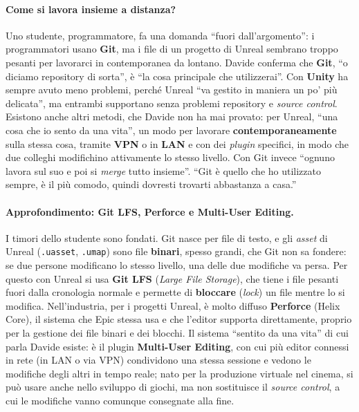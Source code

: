 \paragraph{Come si lavora insieme a distanza?} Uno studente, programmatore, fa una
domanda ``fuori dall'argomento'': i programmatori usano \textbf{Git}, ma i file di un
progetto di Unreal sembrano troppo pesanti per lavorarci in contemporanea da lontano.
Davide conferma che \textbf{Git}, ``o diciamo repository di sorta'', è ``la cosa
principale che utilizzerai''. Con \textbf{Unity} ha sempre avuto meno problemi, perché
Unreal ``va gestito in maniera un po' più delicata'', ma entrambi supportano senza
problemi repository e \emph{source control}. Esistono anche altri metodi, che Davide non
ha mai provato: per Unreal, ``una cosa che io sento da una vita'', un modo per lavorare
\textbf{contemporaneamente} sulla stessa cosa, tramite \textbf{VPN} o in \textbf{LAN} e
con dei \emph{plugin} specifici, in modo che due colleghi modifichino attivamente lo
stesso livello. Con Git invece ``ognuno lavora sul suo e poi si \emph{merge} tutto
insieme''. ``Git è quello che ho utilizzato sempre, è il più comodo, quindi dovresti
trovarti abbastanza a casa.''

\paragraph{Approfondimento: Git LFS, Perforce e Multi-User Editing.} I timori dello
studente sono fondati. Git nasce per file di testo, e gli \emph{asset} di Unreal
(\texttt{.uasset}, \texttt{.umap}) sono file \textbf{binari}, spesso grandi, che Git non
sa fondere: se due persone modificano lo stesso livello, una delle due modifiche va
persa. Per questo con Unreal si usa \textbf{Git LFS} (\emph{Large File Storage}), che
tiene i file pesanti fuori dalla cronologia normale e permette di \textbf{bloccare}
(\emph{lock}) un file mentre lo si modifica. Nell'industria, per i progetti Unreal, è
molto diffuso \textbf{Perforce} (Helix Core), il sistema che Epic stessa usa e che
l'editor supporta direttamente, proprio per la gestione dei file binari e dei blocchi.
Il sistema ``sentito da una vita'' di cui parla Davide esiste: è il plugin
\textbf{Multi-User Editing}, con cui più editor connessi in rete (in LAN o via VPN)
condividono una stessa sessione e vedono le modifiche degli altri in tempo reale; nato
per la produzione virtuale nel cinema, si può usare anche nello sviluppo di giochi, ma
non sostituisce il \emph{source control}, a cui le modifiche vanno comunque consegnate
alla fine.

